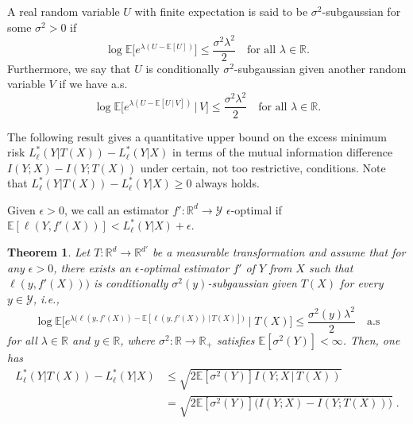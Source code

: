 \documentclass[11pt]{article}
\newtheorem{theorem}{Theorem}
\newcounter{aid}
\def\R{{\mathbb R}}
\def\Y{\mathcal{Y}}
\def\EXP {{\mathbb E}}
\begin{document}
A real random variable $U$ with finite expectation is said to be $\sigma^2$-subgaussian for some $\sigma^2> 0$ if 
\[
\log \EXP\big[e^{\lambda (U-\EXP[U]) }\big] 
    \le  \dfrac{\sigma^2 \lambda^2}{2} \quad \text{for all $\lambda\in \R.$}
\]
Furthermore, we say that $U$ is conditionally $\sigma^2$-subgaussian given another random variable $V$ if we have a.s. 
\begin{equation}
\label{eq-cond-subg}  
\log \EXP\big[e^{\lambda (U-\EXP[U\,|\, V] )} \,\big|\,V\big] 
    \le     \dfrac{\sigma^2 \lambda^2}{2}  \quad \text{for all $\lambda\in \R$.}
\end{equation}



The following result gives a quantitative upper bound on the excess minimum risk
$ L_{\ell}^*(Y|T(X))- L_{\ell}^*(Y|X)$ in terms of  the mutual information difference $ I(Y;X)-I(Y;T(X))$ under certain,
not too restrictive, conditions.  Note that $ L_{\ell}^*(Y|T(X))- L_{\ell}^*(Y|X)\ge 0$ always holds. 


Given   $\epsilon>0$, we call an estimator
$f': \R^d\to \Y$ $\epsilon$-optimal if  $\EXP[\ell(Y,f'(X))] <
L_\ell^*(Y|X)+\epsilon$. 


\begin{theorem}
  \label{thm-subg}
 Let $T:\R^d\to \R^{d'}$ be a measurable transformation and assume
 that for any $\epsilon>0$, there exists an $\epsilon$-optimal
 estimator $f'$ of $Y$ from $X$  such that   $\ell(y,f'(X)))$ is
 conditionally $\sigma^2(y)$-subgaussian  given $T(X)$ for every $y\in \Y$, i.e.,
\begin{equation} 
\label{eq-subgy}
 \log \EXP\big[e^{\lambda \big(\ell(y,f'(X))-\EXP[\ell(y,f'(X)) \,\big|\,   T(X)] \big)} \mid T(X)\big] 
    \le     \dfrac{\sigma^2(y) \lambda^2}{2}  \quad \text{a.s}
\end{equation} 
for all $\lambda\in \R$ and $y\in \R$,   where   $\sigma^2: \R\to \R_+$  satisfies 
$\EXP[\sigma^2(Y)]<\infty$. Then, one has 
\begin{align}  
L_\ell^*(Y|T(X))- L_\ell^*(Y|X)   
&\le    \sqrt{ 2\EXP[\sigma^2(Y)] I(Y;X\,|\, T(X))  } \nonumber \\
& = \sqrt{2\EXP[\sigma^2(Y)]\big( I(Y;X)-I(Y;T(X)) \big) }\; .  \label{eq2}  
 \end{align}
\end{theorem}
\end{document}
